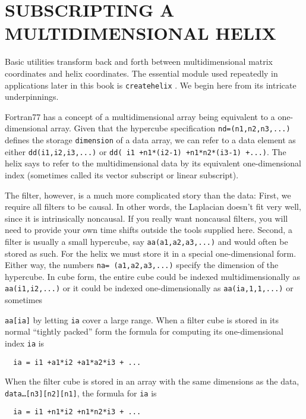 \section{SUBSCRIPTING A MULTIDIMENSIONAL HELIX}
Basic utilities transform back and forth between
multidimensional matrix coordinates and helix coordinates.
The essential module used repeatedly in applications
later in this book is
\texttt{createhelix} .
We begin here from its intricate underpinnings.

\par
Fortran77 has a concept of a multidimensional array being equivalent
to a one-dimensional array.
Given that the hypercube specification
\texttt{nd=(n1,n2,n3,...)} defines the storage
\texttt{dimension} of a data array,
we can refer to a data element as either
\texttt{dd(i1,i2,i3,...)} or 
\texttt{dd( i1 +n1*(i2-1) +n1*n2*(i3-1) +...)}.
The helix says to refer to the multidimensional data
by its equivalent one-dimensional index
(sometimes called its vector subscript or linear subscript).

\par
The filter, however, is a much more complicated story than the data:
First, we require all filters to be causal.
In other words, the Laplacian doesn't fit very well,
since it is intrinsically noncausal.
If you really want noncausal filters,
you will need to provide your own time shifts outside the tools supplied here.
Second, a filter is usually a small hypercube, say
\texttt{aa(a1,a2,a3,...)}
and would often be stored as such.
For the helix we must store it in a special one-dimensional form.
Either way, the numbers
\texttt{na= (a1,a2,a3,...)}
specify the dimension of the hypercube.
In cube form, the entire cube could be indexed
multidimensionally as \texttt{aa(i1,i2,...)} or it could be indexed
one-dimensionally as \texttt{aa(ia,1,1,...)} or sometimes
\begin{comment}
\footnote{
        Some programming minutia:
        Fortran77 does not allow you to refer to an array
        by both its cartesian coordinates
        and by its linear subscript in the same subroutine.
        To access it both ways, you need a subroutine call,
        or you dimension it as 
        \texttt{data(n1,n2,...)}
        and then you refer to it as
        \texttt{data(id,1,1,...)}.
        Fortran90 follows the same rule outside modules.
        Where modules use other modules,
        the compiler does not allow you to refer
        to data both ways,
        unless the array is declared as
        \texttt{allocatable}.
        }
\end{comment}
\texttt{aa[ia]} by letting \texttt{ia} cover a large range.
When a filter cube is stored in its normal ``tightly packed'' form
the formula for computing
its one-dimensional index
\texttt{ia} is
\begin{verbatim}
  ia = i1 +a1*i2 +a1*a2*i3 + ...
\end{verbatim}
When the filter cube is stored in an array
with the same dimensions as the data,
\texttt{data\ldots[n3][n2][n1]},
the formula for \texttt{ia} is
\begin{verbatim}
  ia = i1 +n1*i2 +n1*n2*i3 + ...
\end{verbatim}

